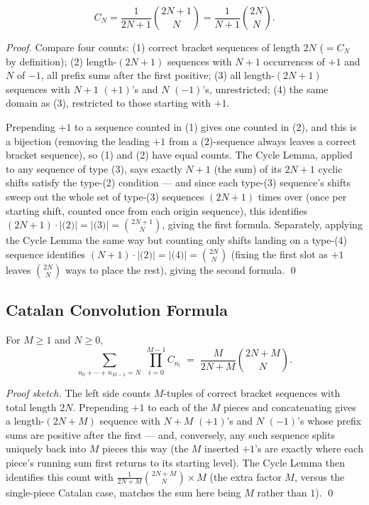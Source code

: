 \documentclass[11pt]{article}
\begin{document}
\begin{theorembox}
\[
  C_N = \frac{1}{2N+1}\binom{2N+1}{N} = \frac{1}{N+1}\binom{2N}{N}.
\]

\emph{Proof.} Compare four counts: (1) correct bracket sequences of
length $2N$ ($=C_N$ by definition); (2) length-$(2N{+}1)$ sequences with
$N{+}1$ occurrences of $+1$ and $N$ of $-1$, all prefix sums after the
first positive; (3) all length-$(2N{+}1)$ sequences with $N{+}1$ $(+1)$'s
and $N$ $(-1)$'s, unrestricted; (4) the same domain as (3), restricted to
those starting with $+1$.

Prepending $+1$ to a sequence counted in (1) gives one counted in (2), and
this is a bijection (removing the leading $+1$ from a (2)-sequence always
leaves a correct bracket sequence), so (1) and (2) have equal counts.
The Cycle Lemma, applied to any sequence of type (3), says exactly $N+1$
(the sum) of its $2N+1$ cyclic shifts satisfy the type-(2) condition ---
and since each type-(3) sequence's shifts sweep out the whole set of
type-(3) sequences $(2N{+}1)$ times over (once per starting shift,
counted once from each origin sequence), this identifies
$(2N{+}1)\cdot|\text{(2)}| = |\text{(3)}| = \binom{2N+1}{N}$, giving the
first formula. Separately, applying the Cycle Lemma the same way but
counting only shifts landing on a type-(4) sequence identifies
$(N{+}1)\cdot|\text{(2)}| = |\text{(4)}| = \binom{2N}{N}$ (fixing the
first slot as $+1$ leaves $\binom{2N}{N}$ ways to place the rest),
giving the second formula. \qed
\end{theorembox}

\subsection{Catalan Convolution Formula}
\begin{theorembox}
For $M \ge 1$ and $N \ge 0$,
\[
  \sum_{n_0+\cdots+n_{M-1}=N} \; \prod_{i=0}^{M-1} C_{n_i}
  \;=\; \frac{M}{2N+M}\binom{2N+M}{N}.
\]

\emph{Proof sketch.} The left side counts $M$-tuples of correct bracket
sequences with total length $2N$. Prepending $+1$ to each of the $M$
pieces and concatenating gives a length-$(2N{+}M)$ sequence with $N{+}M$
$(+1)$'s and $N$ $(-1)$'s whose prefix sums are positive after the first
--- and, conversely, any such sequence splits uniquely back into $M$
pieces this way (the $M$ inserted $+1$'s are exactly where each piece's
running sum first returns to its starting level). The Cycle Lemma then
identifies this count with $\frac{1}{2N+M}\binom{2N+M}{N} \times M$
(the extra factor $M$, versus the single-piece Catalan case, matches the
sum here being $M$ rather than $1$). \qed
\end{theorembox}
\end{document}
